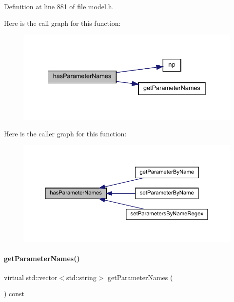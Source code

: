 Definition at line 881 of file model.\+h.

Here is the call graph for this function\+:
\nopagebreak
\begin{figure}[H]
\begin{center}
\leavevmode
\includegraphics[width=335pt]{classamici_1_1_model_a87eb819581d1ca627e5d5ab35ae8add9_cgraph}
\end{center}
\end{figure}
Here is the caller graph for this function\+:
\nopagebreak
\begin{figure}[H]
\begin{center}
\leavevmode
\includegraphics[width=350pt]{classamici_1_1_model_a87eb819581d1ca627e5d5ab35ae8add9_icgraph}
\end{center}
\end{figure}
\mbox{\label{classamici_1_1_model_a7bc0cf1cdd032486ba923fc1d9678262}} 
\paragraph{\texorpdfstring{get\+Parameter\+Names()}{getParameterNames()}}
{\footnotesize\ttfamily virtual std\+::vector$<$std\+::string$>$ get\+Parameter\+Names (\begin{DoxyParamCaption}{ }\end{DoxyParamCaption}) const\hspace{0.3cm}{\ttfamily [virtual]}}

